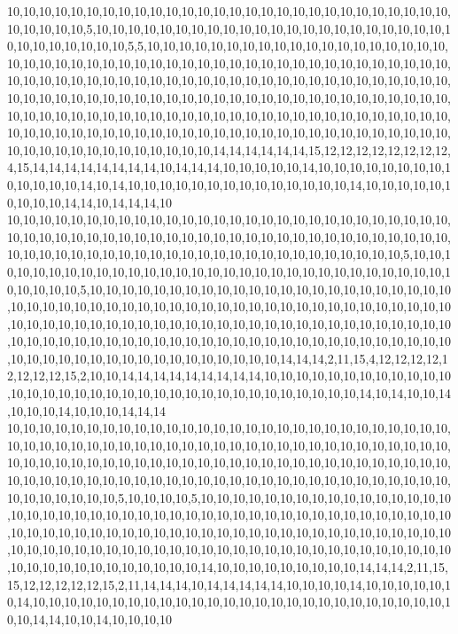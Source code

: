10,10,10,10,10,10,10,10,10,10,10,10,10,10,10,10,10,10,10,10,10,10,10,10,10,10,10,10,10,10,10,10,10,5,10,10,10,10,10,10,10,10,10,10,10,10,10,10,10,10,10,10,10,10,10,10,10,10,10,10,10,10,10,10,5,5,10,10,10,10,10,10,10,10,10,10,10,10,10,10,10,10,10,10,10,10,10,10,10,10,10,10,10,10,10,10,10,10,10,10,10,10,10,10,10,10,10,10,10,10,10,10,10,10,10,10,10,10,10,10,10,10,10,10,10,10,10,10,10,10,10,10,10,10,10,10,10,10,10,10,10,10,10,10,10,10,10,10,10,10,10,10,10,10,10,10,10,10,10,10,10,10,10,10,10,10,10,10,10,10,10,10,10,10,10,10,10,10,10,10,10,10,10,10,10,10,10,10,10,10,10,10,10,10,10,10,10,10,10,10,10,10,10,10,10,10,10,10,10,10,10,10,10,10,10,10,10,10,10,10,10,10,10,10,10,10,10,10,10,10,10,10,10,10,10,10,10,10,14,14,14,14,14,14,15,12,12,12,12,12,12,12,12,4,15,14,14,14,14,14,14,14,14,10,14,14,14,10,10,10,10,10,14,10,10,10,10,10,10,10,10,10,10,10,10,10,14,10,14,10,10,10,10,10,10,10,10,10,10,10,10,10,10,14,10,10,10,10,10,10,10,10,10,14,14,10,14,14,14,10
10,10,10,10,10,10,10,10,10,10,10,10,10,10,10,10,10,10,10,10,10,10,10,10,10,10,10,10,10,10,10,10,10,10,10,10,10,10,10,10,10,10,10,10,10,10,10,10,10,10,10,10,10,10,10,10,10,10,10,10,10,10,10,10,10,10,10,10,10,10,10,10,10,10,10,10,10,10,10,10,10,5,10,10,10,10,10,10,10,10,10,10,10,10,10,10,10,10,10,10,10,10,10,10,10,10,10,10,10,10,10,10,10,10,10,10,10,5,10,10,10,10,10,10,10,10,10,10,10,10,10,10,10,10,10,10,10,10,10,10,10,10,10,10,10,10,10,10,10,10,10,10,10,10,10,10,10,10,10,10,10,10,10,10,10,10,10,10,10,10,10,10,10,10,10,10,10,10,10,10,10,10,10,10,10,10,10,10,10,10,10,10,10,10,10,10,10,10,10,10,10,10,10,10,10,10,10,10,10,10,10,10,10,10,10,10,10,10,10,10,10,10,10,10,10,10,10,10,10,10,10,10,10,10,10,10,10,10,10,10,10,10,14,14,14,2,11,15,4,12,12,12,12,12,12,12,12,15,2,10,10,14,14,14,14,14,14,14,14,14,10,10,10,10,10,10,10,10,10,10,10,10,10,10,10,10,10,10,10,10,10,10,10,10,10,10,10,10,10,10,10,10,10,10,14,10,14,10,10,14,10,10,10,14,10,10,10,14,14,14
10,10,10,10,10,10,10,10,10,10,10,10,10,10,10,10,10,10,10,10,10,10,10,10,10,10,10,10,10,10,10,10,10,10,10,10,10,10,10,10,10,10,10,10,10,10,10,10,10,10,10,10,10,10,10,10,10,10,10,10,10,10,10,10,10,10,10,10,10,10,10,10,10,10,10,10,10,10,10,10,10,10,10,10,10,10,10,10,10,10,10,10,10,10,10,10,10,10,10,10,10,10,10,10,10,10,10,10,10,10,10,10,10,10,10,10,10,10,10,5,10,10,10,10,5,10,10,10,10,10,10,10,10,10,10,10,10,10,10,10,10,10,10,10,10,10,10,10,10,10,10,10,10,10,10,10,10,10,10,10,10,10,10,10,10,10,10,10,10,10,10,10,10,10,10,10,10,10,10,10,10,10,10,10,10,10,10,10,10,10,10,10,10,10,10,10,10,10,10,10,10,10,10,10,10,10,10,10,10,10,10,10,10,10,10,10,10,10,10,10,10,10,10,10,10,10,10,10,10,10,10,10,10,10,10,10,10,14,10,10,10,10,10,10,10,10,10,14,14,14,2,11,15,15,12,12,12,12,12,15,2,11,14,14,14,10,14,14,14,14,14,10,10,10,10,14,10,10,10,10,10,10,14,10,10,10,10,10,10,10,10,10,10,10,10,10,10,10,10,10,10,10,10,10,10,10,10,10,10,10,10,14,14,10,10,14,10,10,10,10
